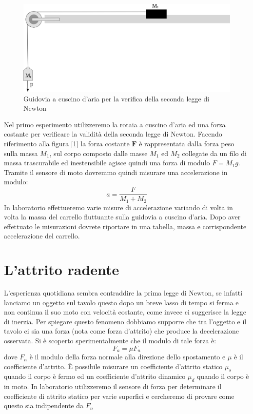\documentclass[a4paper,10pt,oneside]{article}
\begin{document}
\begin{figure}[H]
 \centering
 \includegraphics[width=\textwidth]{./Immagini/guidovia.png}
 \caption{Guidovia a cuscino d'aria per la verifica della seconda legge di Newton}
 \label{fig:guidovia}
\end{figure}
Nel primo esperimento utilizzeremo la rotaia a cuscino d'aria ed una forza costante per verificare la validità della seconda legge di Newton. Facendo riferimento alla figura [\ref{fig:guidovia}] la forza costante $\mathbf{F}$ è rappresentata dalla forza peso sulla massa $M_1$, sul corpo composto dalle masse $M_1$ ed $M_2$ collegate da un filo di massa trascurabile ed inestensibile agisce quindi una forza di modulo $F=M_1 g$. Tramite il sensore di moto dovremmo quindi misurare una accelerazione in modulo:
\begin{equation}
 a=\frac{F}{M_1+M_2}
\end{equation}
In laboratorio effettueremo varie misure di accelerazione variando di volta in volta la massa del carrello fluttuante sulla guidovia a cuscino d'aria. Dopo aver effettuato le misurazioni dovrete riportare in una tabella, massa e corrispondente accelerazione del carrello.

\section{L'attrito radente}
L'esperienza quotidiana sembra contraddire la prima legge di Newton, se infatti lanciamo un oggetto sul tavolo questo dopo un breve lasso di tempo si ferma e non continua il suo moto con velocità costante, come invece ci suggerisce la legge di inerzia.
Per spiegare questo fenomeno dobbiamo supporre che tra l'oggetto e il tavolo ci sia una forza (nota come forza d'attrito) che produce la decelerazione osservata. Si è scoperto sperimentalmente che il modulo di tale forza è:
\begin{equation}
 F_a=\mu F_n
\end{equation}
dove $F_n$ è il modulo della forza normale alla direzione dello spostamento e $\mu$ è il coefficiente d'attrito. È possibile misurare un coefficiente d'attrito statico $\mu_s$ quando il corpo è fermo ed un coefficiente d'attrito dinamico $\mu_d$ quando il corpo è in moto. 
In laboratorio utilizzeremo il sensore di forza per determinare il coefficiente di attrito statico per varie superfici e cercheremo di provare come questo sia indipendente da $F_n$
\end{document}

